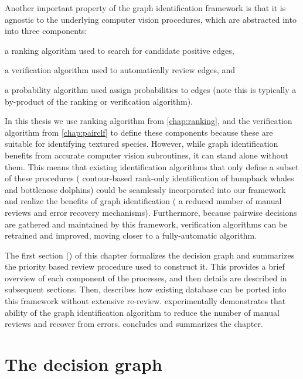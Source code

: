Another important property of the graph identification framework is that it is agnostic to the underlying computer
vision procedures, which are abstracted into into three components:
\begin{enumin}
\item a ranking algorithm used to search for candidate positive edges, %
\item a verification algorithm used to automatically review edges, and %
\item a probability algorithm used assign probabilities to edges (note this is typically a by-product of the
ranking or verification algorithm).
\end{enumin}
In this thesis we use ranking algorithm from \cref{chap:ranking}, and the verification algorithm from
\cref{chap:pairclf} to define these components because these are suitable for identifying textured species.
However, while graph identification benefits from accurate computer vision subroutines, it can stand alone without
them.  This means that existing identification algorithms that only define a subset of these procedures (\eg{}
contour-based rank-only identification of humpback whales and bottlenose dolphins) could be seamlessly incorporated
into our framework and realize the benefits of graph identification (\eg{} a reduced number of manual reviews and
error recovery mechanisms).  Furthermore, because pairwise decisions are gathered and maintained by this framework,
verification algorithms can be retrained and improved, moving closer to a fully-automatic algorithm.


The first section () of this chapter formalizes the decision graph and summarizes the
  priority based review procedure used to construct it.
This provides a brief overview of each component of the processes, and then details are described in subsequent
  sections.
Then,  describes how existing database can be ported into this framework without extensive
  re-review.
 experimentally demonstrates that ability of the graph identification algorithm to reduce the
  number of manual reviews and recover from errors.
 concludes and summarizes the chapter.


\section{The decision graph}\label{sec:decisiongraph}

